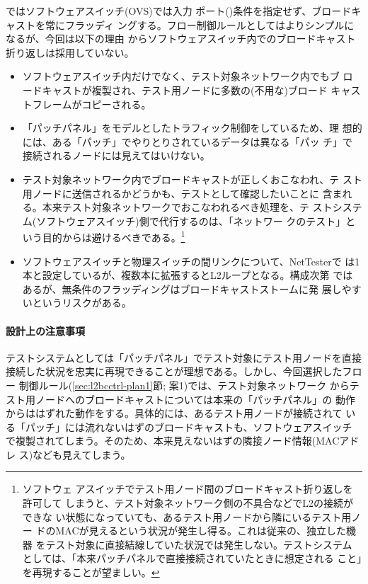 ではソフトウェアスイッチ(OVS)では入力
ポート()条件を指定せず、ブロードキャストを常にフラッディ
ングする。フロー制御ルールとしてはよりシンプルになるが、今回は以下の理由
からソフトウェアスイッチ内でのブロードキャスト折り返しは採用していない。
\begin{itemize}
 \item ソフトウェアスイッチ内だけでなく、テスト対象ネットワーク内でもブ
       ロードキャストが複製され、テスト用ノードに多数の(不用な)ブロード
       キャストフレームがコピーされる。
 \item 「パッチパネル」をモデルとしたトラフィック制御をしているため、理
       想的には、ある「パッチ」でやりとりされているデータは異なる「パッ
       チ」で接続されるノードには見えてはいけない。
 \item テスト対象ネットワーク内でブロードキャストが正しくおこなわれ、テ
       スト用ノードに送信されるかどうかも、テストとして確認したいことに
       含まれる。本来テスト対象ネットワークでおこなわれるべき処理を、テ
       ストシステム(ソフトウェアスイッチ)側で代行するのは、「ネットワー
       クのテスト」という目的からは避けるべきである。\footnote{ソフトウェ
       アスイッチでテスト用ノード間のブロードキャスト折り返しを許可して
       しまうと、テスト対象ネットワーク側の不具合などでL2の接続ができな
       い状態になっていても、あるテスト用ノードから隣にいるテスト用ノー
       ドのMACが見えるという状況が発生し得る。これは従来の、独立した機器
       をテスト対象に直接結線していた状況では発生しない。テストシステム
       としては、「本来パッチパネルで直接接続されていたときに想定される
       こと」を再現することが望ましい。}
 \item ソフトウェアスイッチと物理スイッチの間リンクについて、NetTesterで
       は1本と設定しているが、複数本に拡張するとL2ループとなる。構成次第
       ではあるが、無条件のフラッディングはブロードキャストストームに発
       展しやすいというリスクがある。
\end{itemize}

\paragraph{設計上の注意事項}

テストシステムとしては「パッチパネル」でテスト対象にテスト用ノードを直接
接続した状況を忠実に再現できることが理想である。しかし、今回選択したフロー
制御ルール(\ref{sec:l2bcctrl-plan1}節; 案1)では、テスト対象ネットワーク
からテスト用ノードへのブロードキャストについては本来の「パッチパネル」の
動作からははずれた動作をする。具体的には、あるテスト用ノードが接続されて
いる「パッチ」には流れないはずのブロードキャストも、ソフトウェアスイッチ
で複製されてしまう。そのため、本来見えないはずの隣接ノード情報(MACアドレ
ス)なども見えてしまう。

